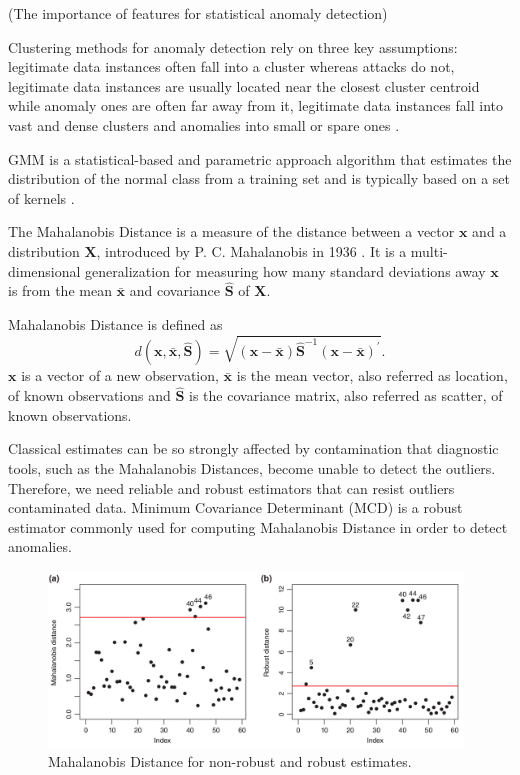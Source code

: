 \documentclass[review]{elsarticle}
\begin{document}
\cite{goldberg2015importance} (The importance of features for statistical anomaly detection)

Clustering methods for anomaly detection rely on three key assumptions: legitimate data instances often fall into a cluster whereas attacks do not, legitimate data instances are usually located near the closest cluster centroid while anomaly ones are often far away from it, legitimate data instances fall into vast and dense clusters and anomalies into small or spare ones \cite{moustafa2019holistic}.

GMM is a statistical-based and parametric approach algorithm that estimates the distribution of the normal class from a training set and is typically based on a set of kernels \cite{moustafa2019holistic}.

The Mahalanobis Distance is a measure of the distance between a vector $\boldsymbol{x}$ and a distribution $\boldsymbol{X}$, introduced by P. C. Mahalanobis in 1936 \cite{mahalanobis1936generalized}. It is a multi-dimensional generalization for measuring how many standard deviations away $\boldsymbol{x}$ is from the mean $\boldsymbol{\bar{x}}$ and covariance $\boldsymbol{\hat{S}}$ of $\boldsymbol{X}$.

Mahalanobis Distance is defined as		
	\begin{equation}\label{eq:eq01}
		d(\boldsymbol{x},\bar{\boldsymbol{x}}, \boldsymbol{\hat{S}}) = \sqrt{(\boldsymbol{x} - \bar{\boldsymbol{x}}) \boldsymbol{\hat{S}}^{-1}(\boldsymbol{x} - \bar{\boldsymbol{x}})^\prime}.
	\end{equation}
$\boldsymbol{x}$ is a vector of a new observation, $\bar{\boldsymbol{x}}$ is the mean vector, also referred as location, of known observations and $\boldsymbol{\hat{S}}$ is the covariance matrix, also referred as scatter, of known observations.

Classical estimates can be so strongly affected by contamination that diagnostic tools, such as the Mahalanobis Distances, become unable to detect the outliers. Therefore, we need reliable and robust estimators that can resist outliers contaminated data. Minimum Covariance Determinant (MCD) \cite{rousseeuw1984least} is a robust estimator commonly used for computing Mahalanobis Distance in order to detect anomalies.

\begin{figure}[h!]
     \centering
     \includegraphics[width=11cm]{figures/mahalanobis_robust.png}
     \caption{Mahalanobis Distance for non-robust and robust estimates.}
     \label{fig:fig04}
\end{figure}
\end{document}
